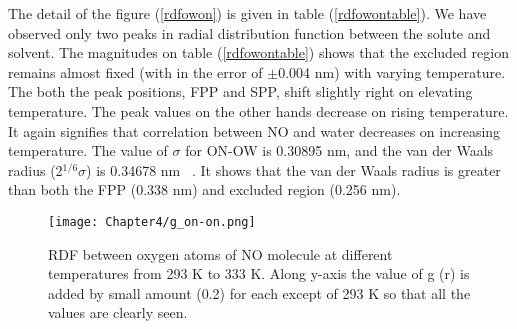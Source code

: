 \begin{table}[H]
\centering
\caption[RDF analysis between oxygen atom of NO molecule and oxygen atom of water molecule]
{ Simulated data for the RDF analysis between oxygen atom of NO molecule and oxygen atom of water molecule at different temperatures, from 293 K to 333 K. } 
\label{rdfowontable}
\end{table}

 The detail of the figure (\ref{rdfowon}) is given  in table (\ref{rdfowontable}). We have observed only two peaks in radial distribution function between the solute and solvent. The magnitudes on table (\ref{rdfowontable}) shows that the excluded region remains almost fixed (with in the error of $\pm$0.004 nm) with varying temperature. The both the peak positions, FPP and SPP, shift slightly right
on elevating temperature. The peak values on the other hands decrease on rising temperature. It again signifies that correlation between NO and water decreases on increasing temperature. The value of $\sigma$ for ON-OW is 0.30895 nm, and the van der Waals
radius (2$^{\mathrm{1/6}}\sigma$) is 0.34678 nm ~\citep{zhou2005molecular, Gromacs-manual}. It shows that the van der Waals radius is greater than both the FPP (0.338 nm) and excluded region (0.256 nm).

\begin{figure}[h!]
\centering
\texttt{[image: Chapter4/g\_on-on.png]}
\caption[RDF between oxygen atoms of NO molecule at different temperatures]{RDF between oxygen atoms of NO molecule at different temperatures from 293 K to 333 K. Along y-axis the value of g (r) is added by small amount (0.2) for each except of  293 K so that all the values are clearly seen.}
\label{rdfonon}
\end{figure}

